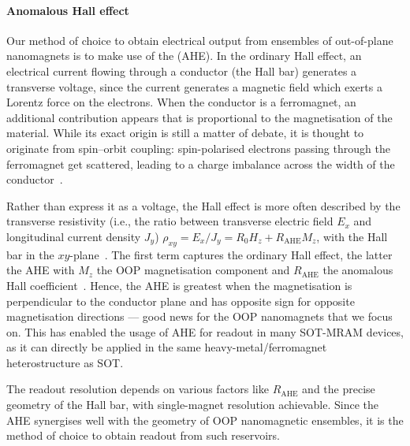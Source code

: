 \paragraph{Anomalous Hall effect}
Our method of choice to obtain electrical output from ensembles of out-of-plane nanomagnets is to make use of the  (AHE).
In the ordinary Hall effect, an electrical current flowing through a conductor (the Hall bar) generates a transverse voltage, since the current generates a magnetic field which exerts a Lorentz force on the electrons.
When the conductor is a ferromagnet, an additional contribution appears that is proportional to the magnetisation of the material.
While its exact origin is still a matter of debate, it is thought to originate from spin--orbit coupling: spin-polarised electrons passing through the ferromagnet get scattered, leading to a charge imbalance across the width of the conductor~\cite{AHE_Culcer,AHE}. \par
Rather than express it as a voltage, the Hall effect is more often described by the transverse resistivity (i.e., the ratio between transverse electric field $E_x$ and longitudinal current density $J_y$) $\rho_{xy} = E_x/J_y = R_0 H_z + R_\mathrm{AHE} M_z$, with the Hall bar in the $xy$-plane~\cite{SHE,AHE}. %
The first term captures the ordinary Hall effect, the latter the AHE with $M_z$ the OOP magnetisation component and $R_\mathrm{AHE}$ the anomalous Hall coefficient~\cite{AHE}.
Hence, the AHE is greatest when the magnetisation is perpendicular to the conductor plane and has opposite sign for opposite magnetisation directions --- good news for the OOP nanomagnets that we focus on.
This has enabled the usage of AHE for readout in many SOT-MRAM devices, as it can directly be applied in the same heavy-metal/ferromagnet heterostructure as SOT. \par
The readout resolution depends on various factors like $R_\mathrm{AHE}$ and the precise geometry of the Hall bar, with single-magnet resolution achievable. %
Since the AHE synergises well with the geometry of OOP nanomagnetic ensembles, it is the method of choice to obtain readout from such reservoirs.

